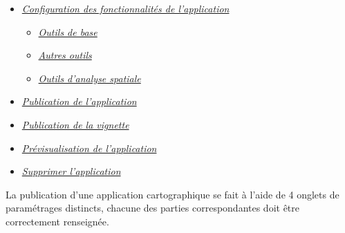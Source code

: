 \documentclass[letterpaper,10pt,french]{sphinxmanual}
\begin{document}
{\begin{minipage}{0.95\linewidth}
\begin{itemize}
\begin{itemize}
\begin{itemize}
\end{itemize}

\item {} 
\label{apps/appconfig:id9}{\hyperref[apps/appconfig:configuration-des-fonctionnalites-de-l-application]{\emph{Configuration des fonctionnalités de l'application}}}
\begin{itemize}
\item {} 
\label{apps/appconfig:id10}{\hyperref[apps/appconfig:outils-de-base]{\emph{Outils de base}}}

\item {} 
\label{apps/appconfig:id11}{\hyperref[apps/appconfig:autres-outils]{\emph{Autres outils}}}

\item {} 
\label{apps/appconfig:id12}{\hyperref[apps/appconfig:outils-d-analyse-spatiale]{\emph{Outils d'analyse spatiale}}}

\end{itemize}

\item {} 
\label{apps/appconfig:id13}{\hyperref[apps/appconfig:publication-de-l-application]{\emph{Publication de l'application}}}

\item {} 
\label{apps/appconfig:id14}{\hyperref[apps/appconfig:publication-de-la-vignette]{\emph{Publication de la vignette}}}

\item {} 
\label{apps/appconfig:id15}{\hyperref[apps/appconfig:previsualisation-de-l-application]{\emph{Prévisualisation de l'application}}}

\item {} 
\label{apps/appconfig:id16}{\hyperref[apps/appconfig:supprimer-l-application]{\emph{Supprimer l'application}}}

\end{itemize}

\end{itemize}
\end{minipage}}
\begin{center}\setlength{\fboxsep}{5pt}\end{center}

La publication d'une application cartographique se fait à l'aide de 4
onglets de paramétrages distincts, chacune des parties correspondantes
doit être correctement renseignée.
\end{document}
